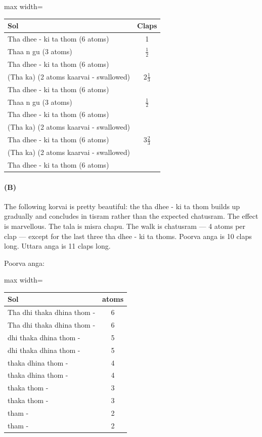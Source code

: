 \begin{center}
\begin{adjustbox}{max width=\textwidth}
\begin{tabular}{l c}
\toprule
Sol & Claps\\
\midrule
Tha dhee - ki ta thom (6 atoms) & 1\\
Thaa n gu (3 atoms)             & $\frac{1}{2}$\\
\midrule
Tha dhee - ki ta thom (6 atoms)             & \multirow{3}{*}{$2\frac{1}{3}$}\\
(Tha ka) (2 atoms kaarvai - swallowed)      & \\
Tha dhee - ki ta thom (6 atoms)             & \\
Thaa n gu (3 atoms)                         & $\frac{1}{2}$\\
\midrule
Tha dhee - ki ta thom (6 atoms)             & \multirow{5}{*}{$3\frac{2}{3}$}\\
(Tha ka) (2 atoms kaarvai - swallowed)      & \\
Tha dhee - ki ta thom (6 atoms)             & \\
(Tha ka) (2 atoms kaarvai - swallowed)      & \\
Tha dhee - ki ta thom (6 atoms)             & \\
\bottomrule
\end{tabular}
\end{adjustbox}
\end{center}

\paragraph{(B)}
The following korvai is pretty beautiful: the tha dhee - ki ta thom builds up
gradually and concludes in tisram rather than the expected chatusram. The effect is
marvellous. The tala is misra chapu. The walk is chatusram --- 4 atoms per clap ---
except for the last three tha dhee - ki ta thoms. Poorva anga is 10 claps long. Uttara
anga is 11 claps long.

Poorva anga:

\begin{center}
\begin{adjustbox}{max width=\textwidth}
\begin{tabular}{l c}
\toprule
Sol & atoms\\
\midrule
Tha dhi thaka dhina thom - & 6\\
Tha dhi thaka dhina thom - & 6\\
dhi thaka dhina thom -     & 5\\
dhi thaka dhina thom -     & 5\\
thaka dhina thom -         & 4\\
thaka dhina thom -         & 4\\
thaka thom -               & 3\\
thaka thom -               & 3\\
tham -                     & 2\\
tham -                     & 2\\
\bottomrule
\end{tabular}
\end{adjustbox}
\end{center}

